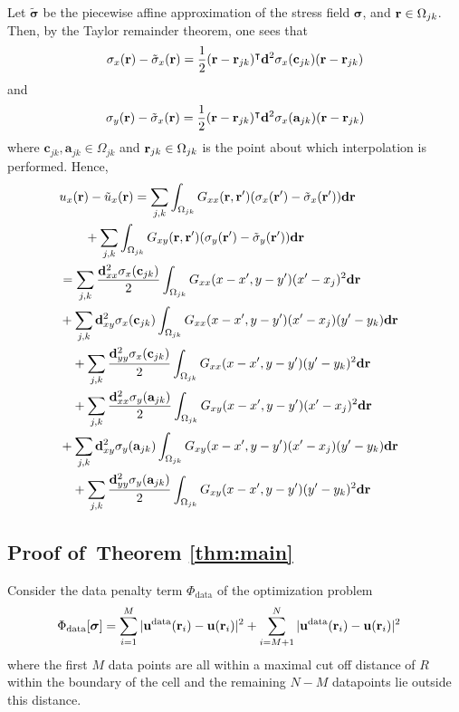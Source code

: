 \documentclass[aps,prl,reprint,twocolumn,groupedaddress,showpacs]{revtex4-1}
\newcommand{\bsigma}{{\boldsymbol\sigma}}
\def\d{{\bf d}}
\def\r{{\bf r}}
\def\u{{\bf u}}
\newcommand{\bs}{\boldsymbol{\sigma}}
\begin{document}
Let $\tilde{\bsigma}$ be the piecewise affine approximation of the stress field $\bsigma$, and $\r\in\Omega_{jk}$. Then,
by the Taylor remainder theorem, one sees that
$$
\sigma_{x}(\r) - \tilde{\sigma}_x(\r) = \frac{1}{2}(\r-\r_{jk})^\intercal\d^2\sigma_{x}(\mathbf{c}_{jk})(\r-\r_{jk})
$$
and
$$
\sigma_{y}(\r) - \tilde{\sigma}_x(\r) = \frac{1}{2}(\r-\r_{jk})^\intercal\d^2\sigma_{x}(\mathbf{a}_{jk})(\r-\r_{jk})
$$
where $\mathbf{c}_{jk},\mathbf{a}_{jk}\in\Omega_{jk}$ and $\r_{jk}\in\Omega_{jk}$ is the point about which interpolation is performed.
Hence,
\begin{align}
\lefteqn{u_x(\r) - \tilde{u}_x(\r)  = \sum_{j,k}\int_{\Omega_{jk}} G_{xx} (\r,\r')(\sigma_{x}(\r') - \tilde{\sigma}_x(\r')) \d\r } \nonumber\\
&\qquad+\sum_{j,k}\int_{\Omega_{jk}} G_{xy} (\r,\r')(\sigma_{y}(\r') - \tilde{\sigma}_y(\r')) \d\r \nonumber\\
&= \sum_{j,k} \frac{\d_{xx}^2\sigma_x(\mathbf{c}_{jk})}{2}\int_{\Omega_{jk}} G_{xx}(x-x',y-y')  (x'-x_j)^2 \d\r \nonumber\\
&  + \sum_{j,k} {\d_{xy}^2\sigma_x(\mathbf{c}_{jk})}\int_{\Omega_{jk}} G_{xx}(x-x',y-y')  (x'-x_j)(y'-y_k)\d\r \nonumber\\
&\quad + \sum_{j,k} \frac{\d_{yy}^2\sigma_x(\mathbf{c}_{jk})}{2}\int_{\Omega_{jk}} G_{xx}(x-x',y-y')  (y'-y_k)^2\d\r \nonumber\\
&\quad + \sum_{j,k} \frac{\d_{xx}^2\sigma_y(\mathbf{a}_{jk})}{2}\int_{\Omega_{jk}} G_{xy}(x-x',y-y')  (x'-x_j)^2\d\r \nonumber\\
&  + \sum_{j,k} {\d_{xy}^2\sigma_y(\mathbf{a}_{jk})}\int_{\Omega_{jk}} G_{xy}(x-x',y-y')  (x'-x_j)(y'-y_k)\d\r \nonumber\\
&\quad + \sum_{j,k} \frac{\d_{yy}^2\sigma_y(\mathbf{a}_{jk})}{2}\int_{\Omega_{jk}} G_{xy}(x-x',y-y')  (y'-y_k)^2\d\r 
\end{align}

\subsection{Proof of~Theorem \ref{thm:main}}

Consider the data penalty term $\Phi_{\textrm{data}}$ of the optimization problem
\begin{align*}
\Phi_{\rm data}[\bs] &=\sum_{i=1}^{M}\vert \u^{\rm
  data}(\r_{i})- \u(\r_i)\vert^{2}  + \sum_{i=M+1}^{N}\vert \u^{\rm
  data}(\r_{i})- \u(\r_i)\vert^{2} 
\end{align*}
where the first $M$ data points are all within a maximal cut off distance of $R$ within the boundary of the cell and the remaining $N-M$ datapoints lie outside this distance.

\end{document}

